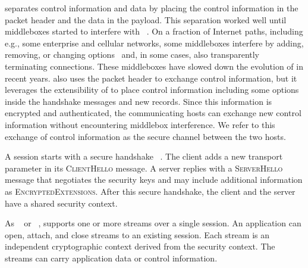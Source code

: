 
\tcp separates control information and data by placing the control information
in the packet header and the data in the payload. This separation worked well
until middleboxes started to interfere with \tcp~\cite{10.1145/1064413.1064418,
honda2011still}. On a fraction of Internet paths, including e.g., some enterprise and cellular networks, some middleboxes interfere by adding, removing, or changing \tcp options~\cite{wang2011untold,honda2011still,xu2015investigating} and, in some cases, also transparently terminating \tcp connections. These middleboxes have slowed down the evolution of \tcp in recent years. \tcpls also uses the packet header to exchange \tcp control information, but it leverages the extensibility of  to place control information including some \tcp options inside the \tls handshake messages and new \tls records. Since this information is encrypted and authenticated, the communicating hosts can exchange new control information without encountering middlebox interference. We refer to this exchange of control information as the secure channel between the two hosts.

A \tcpls session starts with a secure  handshake ~\cite{rfc8446}. The
client adds a new \tcpls transport parameter in its \textsc{ClientHello} message. A \tcpls server replies with a \textsc{ServerHello} message that negotiates the security keys and may include additional \tcpls information as
\textsc{EncryptedExtensions}. After this secure handshake, the client and the
server have a shared security context.

As \sctp~\cite{rfc4960} or \quic~\cite{draft-ietf-quic-transport}, \tcpls
supports one or more streams over a single \tcpls session. An application
can open, attach, and close streams to an existing \tcpls session. Each
stream is an independent cryptographic context derived from the \tcpls
security context. The \tcpls streams can carry application data
or control information.


